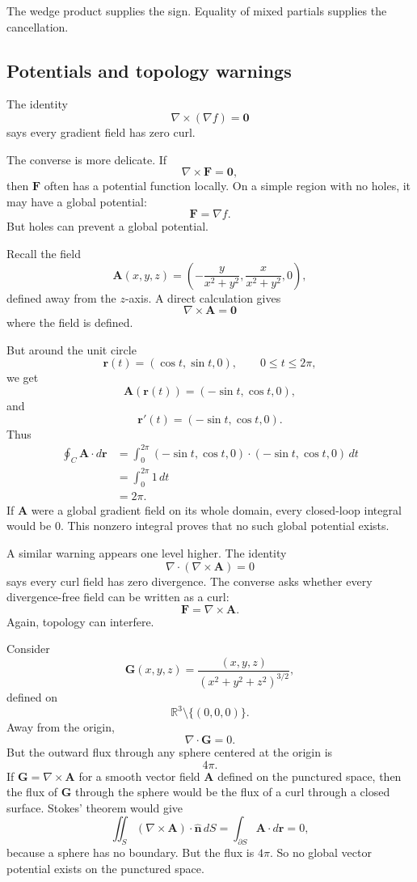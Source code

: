 The wedge product supplies the sign.  Equality of mixed partials supplies the
cancellation.

\subsection{Potentials and topology warnings}

The identity
\[
    \nabla\times(\nabla f)=\mathbf 0
\]
says every gradient field has zero curl.

The converse is more delicate.  If
\[
    \nabla\times\mathbf F=\mathbf 0,
\]
then \(\mathbf F\) often has a potential function locally.  On a simple region with no
holes, it may have a global potential:
\[
    \mathbf F=\nabla f.
\]
But holes can prevent a global potential.

Recall the field
\[
    \mathbf A(x,y,z)
    =
    \left(
    -\frac{y}{x^2+y^2},
    \frac{x}{x^2+y^2},
    0
    \right),
\]
defined away from the \(z\)-axis.  A direct calculation gives
\[
    \nabla\times\mathbf A=\mathbf 0
\]
where the field is defined.

But around the unit circle
\[
    \mathbf r(t)=(\cos t,\sin t,0),
    \qquad 0\le t\le2\pi,
\]
we get
\[
    \mathbf A(\mathbf r(t))=(-\sin t,\cos t,0),
\]
and
\[
    \mathbf r'(t)=(-\sin t,\cos t,0).
\]
Thus
\[
\begin{aligned}
\oint_C \mathbf A\cdot d\mathbf r
&=
\int_0^{2\pi}
(-\sin t,\cos t,0)\cdot(-\sin t,\cos t,0)\,dt\\
&=
\int_0^{2\pi}1\,dt\\
&=
2\pi.
\end{aligned}
\]
If \(\mathbf A\) were a global gradient field on its whole domain, every closed-loop
integral would be \(0\).  This nonzero integral proves that no such global potential
exists.

A similar warning appears one level higher.  The identity
\[
    \nabla\cdot(\nabla\times\mathbf A)=0
\]
says every curl field has zero divergence.  The converse asks whether every
divergence-free field can be written as a curl:
\[
    \mathbf F=\nabla\times\mathbf A.
\]
Again, topology can interfere.

Consider
\[
    \mathbf G(x,y,z)
    =
    \frac{(x,y,z)}{(x^2+y^2+z^2)^{3/2}},
\]
defined on
\[
    \mathbb R^3\setminus\{(0,0,0)\}.
\]
Away from the origin,
\[
    \nabla\cdot\mathbf G=0.
\]
But the outward flux through any sphere centered at the origin is
\[
    4\pi.
\]
If \(\mathbf G=\nabla\times\mathbf A\) for a smooth vector field \(\mathbf A\) defined
on the punctured space, then the flux of \(\mathbf G\) through the sphere would be the
flux of a curl through a closed surface.  Stokes' theorem would give
\[
    \iint_S(\nabla\times\mathbf A)\cdot\widehat{\mathbf n}\,dS
    =
    \int_{\partial S}\mathbf A\cdot d\mathbf r
    =
    0,
\]
because a sphere has no boundary.  But the flux is \(4\pi\).  So no global vector
potential exists on the punctured space.

